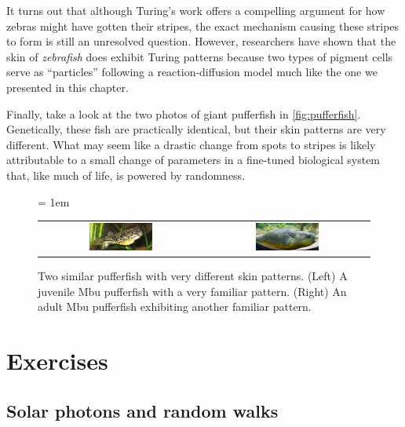 It turns out that although Turing's work offers a compelling argument for how zebras might have gotten their stripes, the exact mechanism causing these stripes to form is still an unresolved question. However, researchers have shown that the skin of \textit{zebrafish} does exhibit Turing patterns because two types of pigment cells serve as ``particles'' following a reaction-diffusion model much like the one we presented in this chapter.

Finally, take a look at the two photos of giant pufferfish in \autoref{fig:pufferfish}. Genetically, these fish are practically identical, but their skin patterns are very different. What may seem like a drastic change from spots to stripes is likely attributable to a small change of parameters in a fine-tuned biological system that, like much of life, is powered by randomness.\\

\begin{figure}[h]
\centering
\mySfFamily
\tabcolsep = 1em
\begin{tabular}{c c}
\includegraphics[width = 0.4\textwidth]{../images/Juvenile_Mbu_pufferfish.jpg} & \includegraphics[width = 0.4\textwidth]{../images/Giant_Puffer_fish_skin_pattern.jpg}
\end{tabular}
\caption{Two similar pufferfish with very different skin patterns. (Left) A juvenile Mbu pufferfish with a very familiar pattern. (Right) An adult Mbu pufferfish exhibiting another familiar pattern.}
\label{fig:pufferfish}
\end{figure}

\FloatBarrier
{}
\newpage
\section{Exercises}

\subsection{Solar photons and random walks}

